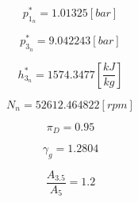 \documentclass[titlepage]{article}
\begin{document}
\begin{equation}
  p_{1_{n}}^{*} =  1.01325 [bar]
\end{equation}

\begin{equation}
  p_{3_{n}}^{*} =  9.042243 [bar]
\end{equation}

\begin{equation}
  h_{3_{n}}^{*} =  1574.3477 \left[\frac{kJ}{kg}\right]
\end{equation}

\begin{equation}
  N_{n} = 52612.464822 [rpm]
\end{equation}

\begin{equation}
  \pi_{D} = 0.95
\end{equation}

\begin{equation}
  \gamma_{g} = 1.2804
\end{equation}

\begin{equation}
  \frac{A_{3.5}}{A_{5}} = 1.2
\end{equation}
\end{document}
